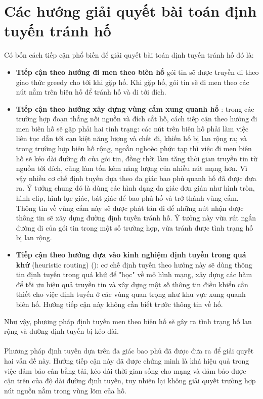 \documentclass[12pt]{report}
\begin{document}
\section{Các hướng giải quyết bài toán định tuyến tránh hố}
\label{sec:1.3}
Có bốn cách tiếp cận phổ biến để giải quyết bài toán định tuyến tránh hố đó là:
\begin{itemize}
\item \textbf{Tiếp cận theo hướng đi men theo biên hố} \cite{boundhole, gpsr} gói tin sẽ được truyền đi theo giao thức greedy cho tới khi gặp hố. Khi gặp hố, gói tin sẽ đi men theo các nút nằm trên biên hố để tránh hố và đi tới đích. 
\item \textbf{Tiếp cận theo hướng xây dựng vùng cấm xung quanh hố} \cite{bedh, elipse, hexagon, octagon, bsmh}: trong các trường hợp đoạn thẳng nối nguồn và đích cắt hố, cách tiếp cận theo hướng đi men biên hố sẽ gặp phải hai tình trạng: các nút trên biên hố phải làm việc liên tục dẫn tới cạn kiệt năng lượng và chết đi, khiến hố bị lan rộng ra; và trong trường hợp biên hố rộng, ngoằn nghoèo phức tạp thì việc đi men biên hố sẽ kéo dài đường đi của gói tin, đồng thời làm tăng thời gian truyền tin từ nguồn tới đích, cũng làm tốn kém năng lượng của nhiều nút mạng hơn. Vì vậy nhiều cơ chế định tuyến dựa theo đa giác bao phủ quanh hố đã được đưa ra. Ý tưởng chung đó là dùng các hình dạng đa giác đơn giản như hình tròn, hình elip, hình lục giác, bát giác để bao phủ hố và trở thành vùng cấm. Thông tin về vùng cấm này sẽ được phát tán đi để những nút nhận được thông tin sẽ xây dựng đường định tuyến tránh hố. Ý tưởng này vừa rút ngắn đường đi của gói tin trong một số trường hợp, vừa tránh được tình trạng hố bị lan rộng.
\item \textbf{Tiếp cận theo hướng dựa vào kinh nghiệm định tuyến trong quá khứ} (heuristic routing) (\cite{edgr}): cơ chế định tuyến theo hướng này sẽ dùng thông tin định tuyến trong quá khứ để "học" về mô hình mạng, xây dựng các hàm để tối ưu hiệu quả truyền tin và xây dựng một số thông tin điều khiển cần thiết cho việc định tuyến ở các vùng quan trọng như khu vực xung quanh biên hố. Hướng tiếp cận này không cần biết trước thông tin về hố.
\end{itemize}
Như vậy, phương pháp định tuyến men theo biên hố sẽ gây ra tình trạng hố lan rộng và đường định tuyến bị kéo dài. \\ \\
Phương pháp định tuyến dựa trên đa giác bao phủ đã được đưa ra để giải quyết hai vấn đề này. Hướng tiếp cận này đã được chứng minh là khá hiệu quả trong việc đảm bảo cân bằng tải, kéo dài thời gian sống cho mạng và đảm bảo được cận trên của độ dài đường định tuyến, tuy nhiên lại không giải quyết trường hợp nút nguồn nằm trong vùng lõm của hố. 
\end{document}
